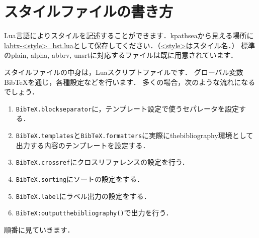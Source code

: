 \documentclass[a4paper]{ltjsarticle}
\newcommand{\luafunc}[1]{\texttt{#1}}
\newcommand*{\luavar}[1]{\texttt{#1}}
\begin{document}
\section{スタイルファイルの書き方}
Lua言語によりスタイルを記述することができます．kpathseaから見える場所に\url{labtx-<style>_bst.lua}として保存してください．（\url{<style>}はスタイル名．）
標準のplain, alpha, abbrv, unsrtに対応するファイルは既に用意されています．

スタイルファイルの中身は，Luaスクリプトファイルです．
グローバル変数BibTeXを通じ，各種設定などを行います．
多くの場合，次のような流れになるでしょう．
\begin{enumerate}
\item \luavar{BibTeX.blockseparator}に，テンプレート設定で使うセパレータを設定する．
\item \luavar{BibTeX.templates}と\luavar{BibTeX.formatters}に実際にthebibliography環境として出力する内容のテンプレートを設定する．
\item \luavar{BibTeX.crossref}にクロスリファレンスの設定を行う．
\item \luavar{BibTeX.sorting}にソートの設定をする．
\item \luavar{BibTeX.label}にラベル出力の設定をする．
\item \luafunc{BibTeX:outputthebibliography()}で出力を行う．
\end{enumerate}
順番に見ていきます．
\end{document}
